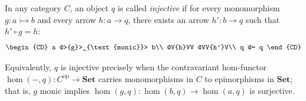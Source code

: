 In any category $C$, an object $q$ is called \textit{injective} if for every monomorphism $g : a \rightarrowtail b$ and every arrow $h : a \rightarrow q$, there exists an arrow $h' : b \rightarrow q$ such that $h' \circ g = h$:
\[
\begin{CD}
a @>{g}>_{\text{monic}}> b\\
@V{h}VV @VV{h'}V\\
q @= q
\end{CD}
\]

Equivalently, $q$ is injective precisely when the contravariant hom-functor $\hom(-, q) : C^{\text{op}} \rightarrow \mathbf{Set}$ carries monomorphisms in $C$ to epimorphisms in $\mathbf{Set}$; that is, $g$ monic implies $\hom(g, q) : \hom(b, q) \rightarrow \hom(a, q)$ is surjective.
